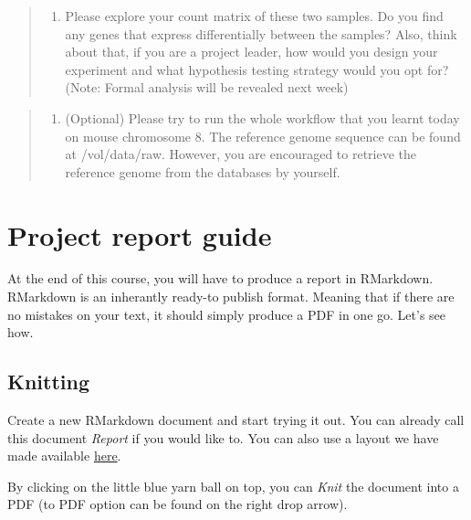 \documentclass[
]{book}
\providecommand{\tightlist}{%
  \setlength{\itemsep}{0pt}\setlength{\parskip}{0pt}}
\begin{document}
\begin{quote}
\begin{enumerate}
\def\labelenumi{\arabic{enumi}.}
\setcounter{enumi}{1}
\tightlist
\item
  Please explore your count matrix of these two samples. Do you find any genes that express differentially between the samples? Also, think about that, if you are a project leader, how would you design your experiment and what hypothesis testing strategy would you opt for? (Note: Formal analysis will be revealed next week)
\end{enumerate}
\end{quote}

\begin{quote}
\begin{enumerate}
\def\labelenumi{\arabic{enumi}.}
\setcounter{enumi}{2}
\tightlist
\item
  (Optional) Please try to run the whole workflow that you learnt today on mouse chromosome 8. The reference genome sequence can be found at /vol/data/raw. However, you are encouraged to retrieve the reference genome from the databases by yourself.
\end{enumerate}
\end{quote}

\hypertarget{project-report-guide}{%
\chapter*{Project report guide}\label{project-report-guide}}

At the end of this course, you will have to produce a report in RMarkdown. RMarkdown is an inherantly ready-to publish format. Meaning that if there are no mistakes on your text, it should simply produce a PDF in one go. Let's see how.

\hypertarget{knitting}{%
\section{Knitting}\label{knitting}}

Create a new RMarkdown document and start trying it out. You can already call this document \emph{Report} if you would like to. You can also use a layout we have made available \href{https://github.com/hdsu-bioquant/bioinfo_MoBiMA/tree/main/report_example}{here}.

By clicking on the little blue yarn ball on top, you can \emph{Knit} the document into a PDF (to PDF option can be found on the right drop arrow).
\end{document}

